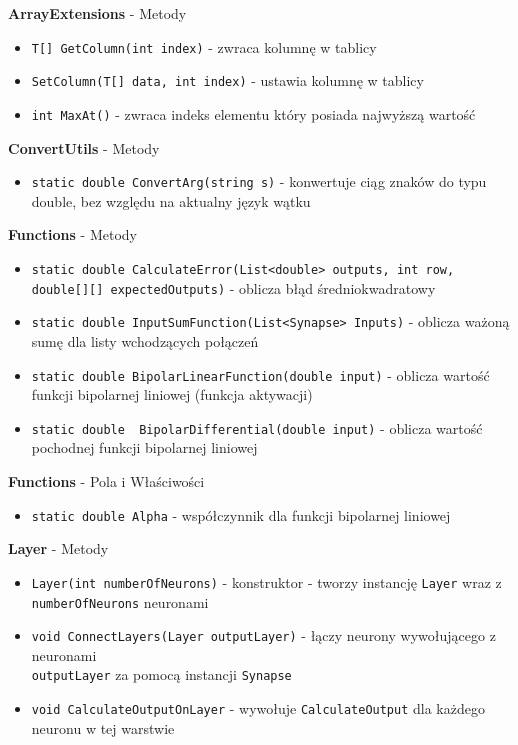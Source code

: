 \documentclass[12pt,a4paper]{article}
\begin{document}
    \textbf{ArrayExtensions} - Metody
    \begin{itemize}
        \item \lstinline{T[] GetColumn(int index)} - zwraca kolumnę w tablicy
        \item \lstinline{SetColumn(T[] data, int index)} - ustawia kolumnę w tablicy
        \item \lstinline{int MaxAt()} - zwraca indeks elementu który posiada najwyższą wartość
    \end{itemize}
    
    \textbf{ConvertUtils} - Metody
    \begin{itemize}
        \item \lstinline{static double ConvertArg(string s)} - konwertuje ciąg znaków do typu double, bez względu na aktualny język wątku
    \end{itemize}
    
    \textbf{Functions} - Metody
    
        \begin{itemize}
            \item \lstinline{static double CalculateError(List<double> outputs, int row, double[][] expectedOutputs)} - oblicza błąd średniokwadratowy
            
            \item \lstinline{static double InputSumFunction(List<Synapse> Inputs)} - oblicza ważoną sumę dla listy wchodzących połączeń
            
            \item \lstinline{static double BipolarLinearFunction(double input)} - oblicza wartość funkcji bipolarnej liniowej (funkcja aktywacji)
            
            \item \lstinline{static double  BipolarDifferential(double input)} - oblicza wartość pochodnej funkcji bipolarnej liniowej
        \end{itemize}
        
    \textbf{Functions} - Pola i Właściwości
    \begin{itemize}
         \item \lstinline{static double Alpha} - współczynnik dla funkcji bipolarnej liniowej
    \end{itemize}

    \textbf{Layer} - Metody
    \begin{itemize}
        \item \lstinline{Layer(int numberOfNeurons)} - konstruktor - tworzy instancję \lstinline{Layer} wraz z \lstinline{numberOfNeurons} neuronami
        \item \lstinline{void ConnectLayers(Layer outputLayer)} - łączy neurony wywołującego z neuronami \\ \lstinline{outputLayer} za pomocą instancji \lstinline{Synapse}
        \item \lstinline{void CalculateOutputOnLayer} - wywołuje \lstinline{CalculateOutput} dla każdego neuronu w tej warstwie
    \end{itemize}
    
\end{document}
